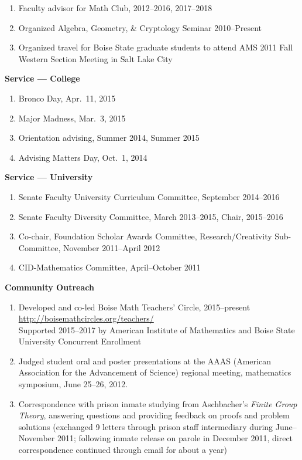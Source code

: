\documentclass[12pt]{article}
\begin{document}
\begin{enumerate}
\item Faculty advisor for Math Club, 2012--2016, 2017--2018

\item Organized Algebra, Geometry, \& Cryptology Seminar 2010--Present

\item Organized travel for Boise State graduate students to attend AMS 2011 Fall Western Section Meeting in Salt Lake City

\end{enumerate}

\textbf{Service --- College}
\begin{enumerate}
\item Bronco Day, Apr.\ 11, 2015
\item Major Madness, Mar.\ 3, 2015
\item Orientation advising, Summer 2014, Summer 2015
\item Advising Matters Day, Oct.\ 1, 2014
\end{enumerate}


\textbf{Service --- University}
\begin{enumerate}
\item Senate Faculty University Curriculum Committee, September 2014--2016

\item Senate Faculty Diversity Committee, March 2013--2015, Chair, 2015--2016

\item Co-chair, Foundation Scholar Awards Committee, Research/Creativity Sub-Committee, Nov\-ember 2011--April 2012

\item CID-Mathematics Committee, April--October 2011
\end{enumerate}

\textbf{Community Outreach}
\begin{enumerate}
\item Developed and co-led Boise Math Teachers' Circle, 2015--present \\
\url{http://boisemathcircles.org/teachers/} \\
Supported 2015--2017 by American Institute of Mathematics and Boise State University Concurrent Enrollment

\item Judged student oral and poster presentations
at the AAAS (American Association for the Advancement of Science)
regional meeting, mathematics symposium,
June 25--26, 2012.

\item Correspondence with prison inmate studying from Aschbacher's \textit{Finite Group Theory},
answering questions and providing feedback on proofs and problem solutions
(exchanged 9 letters through prison staff intermediary during June--November 2011;
following inmate release on parole in December 2011, direct correspondence continued through email for about a year)

\end{enumerate}
\end{document}
